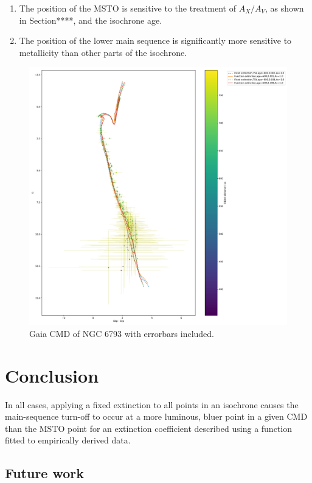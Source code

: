 \documentclass[12pt, a4paper]{report}
\begin{document}
\begin{enumerate}
\item The position of the MSTO is sensitive to the treatment of $A_{X}/A_{V}$, as shown in Section****, and the isochrone age.
\item The position of the lower main sequence is significantly more sensitive to metallicity than other parts of the isochrone.
\end{enumerate}



\begin{figure}[h]
\begin{center}
\includegraphics[scale=0.3]{../NGC_6793_CMD_FeH_0p002_0p198_Av_1p0_600Myr_isochrones_both_errorbars_T5k.pdf}
\caption{Gaia CMD of NGC 6793 with errorbars included.}
\label{ngc_errorbars}
\end{center}
\end{figure}

\chapter{Conclusion}
In all cases, applying a fixed extinction to all points in an isochrone causes the main-sequence turn-off to occur at a more luminous, bluer point in a given CMD than the MSTO point for an extinction coefficient described using a function fitted to empirically derived data.

\section{Future work}



\end{document}
